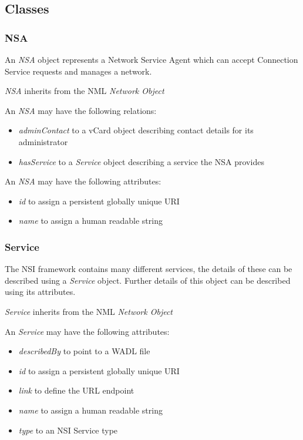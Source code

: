 \documentclass[12pt]{article}  %
\begin{document}
\subsection{Classes}%
\label{sub:classes}

\subsubsection{NSA}%
\label{class:nsa}

An \emph{NSA} object represents a Network Service Agent which can accept Connection Service requests and manages a network.

\emph{NSA} inherits from the NML \emph{Network Object}

An \emph{NSA} may have the following relations:
\begin{itemize}
  \item \emph{adminContact} to a vCard object describing contact details for its administrator
  \item \emph{hasService} to a \emph{Service} object describing a service the NSA provides
\end{itemize}

An \emph{NSA} may have the following attributes:
\begin{itemize}
  \item \emph{id} to assign a persistent globally unique URI
  \item \emph{name} to assign a human readable string  
\end{itemize}

\subsubsection{Service}%
\label{class:Service}

The NSI framework contains many different services, the details of these can be described using a \emph{Service} object. Further details of this object can be described using its attributes.

\emph{Service} inherits from the NML \emph{Network Object}

An \emph{Service} may have the following attributes:
\begin{itemize}
  \item \emph{describedBy} to point to a WADL file
  \item \emph{id} to assign a persistent globally unique URI
  \item \emph{link} to define the URL endpoint
  \item \emph{name} to assign a human readable string  
  \item \emph{type} to an NSI Service type
\end{itemize}
\end{document}
